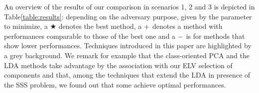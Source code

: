 \medskip

An overview of the results of our comparison in scenarios 1, 2 and 3 is depicted in Table\ref{table:results}: depending on the adversary purpose, given by the parameter to minimize, a $\bigstar$ denotes the best method, a ${\bf +}$ denotes a method with performances comparable to those of the best one and a ${\bf -}$ is for methods that show lower performances. Techniques introduced in this paper are highlighted by a grey background. We remark for example that the class-oriented PCA and the LDA methods take advantage by the association with our ELV selection of components and that, among the techniques that extend the LDA in presence of the SSS problem, we found out that some achieve optimal performances.



